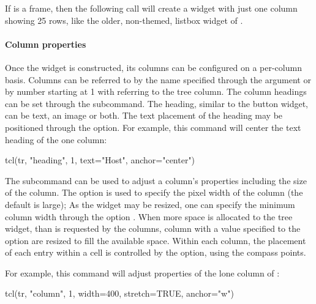 If  is a frame, then the following call will create a widget with just one column showing 25 rows, like the older, non-themed, listbox widget of \Tk.

\begin{Schunk}
\end{Schunk}

\paragraph{Column properties}
Once the widget is constructed, its columns can be configured on a
per-column basis. Columns can be referred to by the name specified
through the  argument or by number starting at 1 with
 referring to the tree column. The column headings can be
set through the  subcommand. The
heading, similar to the button widget, can be text, an image or
both. The text placement of the heading may be positioned through the
 option. For example, this command will center the text
heading of the one column:
\begin{Schunk}
\begin{Sinput}
 tcl(tr, "heading", 1, text="Host", anchor="center")
\end{Sinput}
\end{Schunk}

The  subcommand can be used to adjust
a column's properties including the size of the column. The option
 is used to specify the pixel width of the column (the
default is large); As the widget may be resized, one can specify the
minimum column width through the option . When more
space is allocated to the tree widget, than is requested by the
columns, column with a  value specified to the option
 are resized to fill the available space. Within each
column, the placement of each entry within a cell is controlled by the
 option, using the compass points.

For example, this command will adjust properties of the lone column of :
\begin{Schunk}
\begin{Sinput}
 tcl(tr, "column", 1, width=400,  stretch=TRUE, anchor="w")
\end{Sinput}
\end{Schunk}

